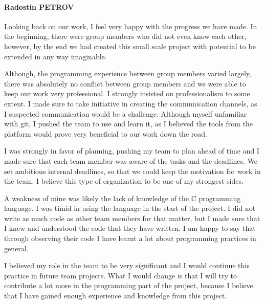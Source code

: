 \documentclass[11pt]{article}
\begin{document}
\paragraph{Radostin PETROV} Looking back on our work, I feel very happy with the progress we have made. In the beginning, there were group members who did not even know each other, however, by the end we had created this small scale project with potential to be extended in any way imaginable.
\par Although, the programming experience between group members varied largely, there was absolutely no conflict between group members and we were able to keep our work very professional. I strongly insisted on professionalism to some extent. I made sure to take initiative in creating the communication channels, as I suspected communication would be a challenge. Although myself unfamiliar with git, I pushed the team to use and learn it, as I believed the tools from the platform would prove very beneficial to our work down the road.
\par I was strongly in favor of planning, pushing my team to plan ahead of time and I made sure that each team member was aware of the tasks and the deadlines. We set ambitious internal deadlines, so that we could keep the motivation for work in the team. I believe this type of organization to be one of my strongest sides.
\par A weakness of mine was likely the lack of knowledge of the C programming language. I was timid in using the language in the start of the project. I did not write as much code as other team members for that matter, but I made sure that I knew and understood the code that they have written. I am happy to say that through observing their code I have learnt a lot about programming practices in general.
\par I believed my role in the team to be very significant and I would continue this practice in future team projects. What I would change is that I will try to contribute a lot more in the programming part of the project, because I believe that I have gained enough experience and knowledge from this project.
\end{document}
